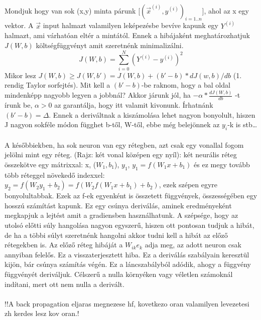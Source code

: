 \documentclass[10pt,a4paper]{report}
\begin{document}
\paragraph{}
Mondjuk hogy van sok (x,y) minta párunk [$(\vec{x}^{(i)},y^{(i)})_{i=1..n}$], ahol az x egy vektor. A $\vec{x}$ input halmazt valamilyen leképezésbe bevíve kapunk egy $Y^{(i)}$ halmazt, ami várhatóan eltér a mintától. Ennek a hibájaként meghatározhatjuk $J(W,b)$ költségfüggvényt amit szeretnénk minimalizálni.
\begin{equation}
J(W,b) = \sum_{i=0}^N (Y^{(i)}-y^{(i)})^2
\end{equation}
Mikor lesz $ J(W,b) \geq J(W,b') = J(W,b) + (b'-b)*dJ(w,b)/db$ (1. rendig Taylor sorfejtés). Mit kell a $(b'-b)$-be raknom, hogy a bal oldal mindenképp nagyobb legyen a jobbnál? Akkor járunk jól, ha $-\alpha * \frac{dJ(W,b)}{db}$ -t írunk be, $ \alpha > 0$ az garantálja, hogy itt valamit kivonunk. Írhatnánk $ (b'-b) = \Delta$.
Ennek a deriváltnak a kiszámolása lehet nagyon bonyolult, hiszen J nagyon sokféle módon függhet b-től, W-től, ebbe még belejönnek az $y_i$-k is stb\dots
\paragraph{}

A későbbiekben, ha sok neuron van egy rétegben, azt csak egy vonallal fogom jelölni mint egy réteg. (Rajz: két vonal középen egy nyíl): két neurális réteg összekötve egy mátrixxal: x, ($W_1, b_1$), $y_1$, $ y_1=f(W_1 x+b_1)$ és ez megy tovább több réteggel növekedő indexxel: $ y_2 = f(W_2 y_1+b_2) = f(W_2 f(W_1 x + b_1) + b_2)$, ezek szépen egyre bonyolultabbak.
Ezek az f-ek egyenként is összetett függvények, összességében egy hosszú számítást kapunk. Ez egy csúnya deriválás, aminek eredményeként megkapjuk a lejtést amit a gradiensben használhatunk.
A szépsége, hogy az utolsó előtti súly hangolása nagyon egyszerű, hiszen ott pontosan tudjuk a hibát, de ha a többi súlyt szeretnénk hangolni akkor tudni kell a hibát az előző rétegekben is. Az előző réteg hibáját a $W_{ik}e_k$ adja meg, az adott neuron csak annyiban felelős. Ez a visszaterjesztett hiba. Ez a deriválás szabályain keresztül kijön, bár csúnya számítás végén. Ez a láncszabályból adódik, ahogy a függvény függvényét deriváljuk. Célszerű a nulla környéken vagy véletlen számoknál indítani, mert ott nem nulla a derivált.
\paragraph{}
!!A back propagation eljaras megnezese hf, kovetkezo oran valamilyen levezetesi zh kerdes lesz kov oran.!
\end{document}
